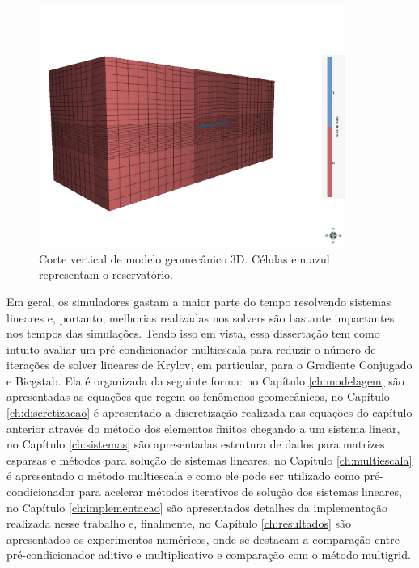 \begin{figure}[!htbp]
\centering
\includegraphics[width=10cm]{chap00/figs/Geresim(0054).png}
\caption{Corte vertical de modelo geomecânico 3D. Células em azul representam o reservatório.}
\label{fig:modelogeomec3d}
\end{figure}

Em geral, os simuladores gastam a maior parte do tempo resolvendo sistemas lineares e, portanto, melhorias realizadas nos solvers são bastante impactantes nos tempos das simulações. Tendo isso em vista, essa dissertação tem como intuito avaliar um pré-condicionador multiescala para reduzir o número de iterações de solver lineares de Krylov, em particular, para o Gradiente Conjugado e Bicgstab. Ela é organizada da seguinte forma: no Capítulo \ref{ch:modelagem} são apresentadas as equações que regem os fenômenos geomecânicos, no Capítulo \ref{ch:discretizacao} é apresentado a discretização realizada nas equações do capítulo anterior através do método dos elementos finitos chegando a um sistema linear, no Capítulo \ref{ch:sistemas} são apresentadas estrutura de dados para matrizes esparsas e métodos para solução de sistemas lineares, no Capítulo \ref{ch:multiescala} é apresentado o método multiescala e como ele pode ser utilizado como pré-condicionador para acelerar métodos iterativos de solução dos sistemas lineares, no Capítulo \ref{ch:implementacao} são apresentados detalhes da implementação realizada nesse trabalho e, finalmente, no Capítulo \ref{ch:resultados} são apresentados os experimentos numéricos, onde se destacam a comparação entre pré-condicionador aditivo e multiplicativo e comparação com o método multigrid. 




